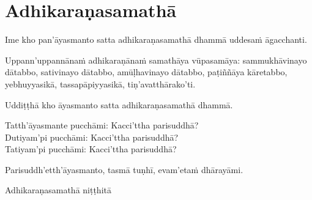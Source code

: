 \section{Adhikaraṇasamathā}
\label{adhi}

\begin{intro}
  Ime kho pan'āyasmanto satta adhikaraṇasamathā dhammā uddesaṁ āgacchanti.
\end{intro}

Uppann'uppannānaṁ adhikaraṇānaṁ samathāya vūpasamāya: sammukhāvinayo dātabbo, sativinayo dātabbo, amūḷhavinayo dātabbo, paṭiññāya kāretabbo, yebhuyyasikā, tassapāpiyyasikā, tiṇ'avatthārako'ti.

\medskip

\begin{center}
Uddiṭṭhā kho āyasmanto satta adhikaraṇasamathā dhammā.

\smallskip

Tatth'āyasmante pucchāmi: Kacci'ttha parisuddhā?\\
Dutiyam'pi pucchāmi: Kacci'ttha parisuddhā?\\
Tatiyam'pi pucchāmi: Kacci'ttha parisuddhā?

\smallskip

Parisuddh'etth'āyasmanto, tasmā tuṇhī, evam'etaṁ dhārayāmi.
\end{center}

\begin{outro}
  Adhikaraṇasamathā niṭṭhitā
\end{outro}

\clearpage
